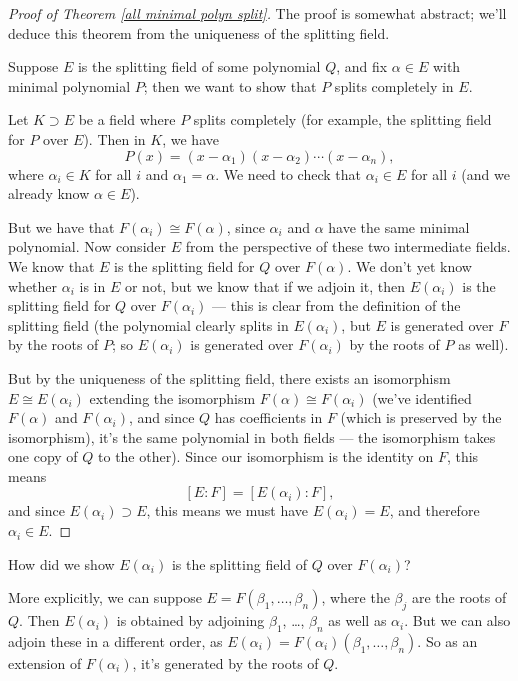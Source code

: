 \begin{proof}[Proof of Theorem \ref{all minimal polyn split}]
    The proof is somewhat abstract; we'll deduce this theorem from the uniqueness of the splitting field. 

    Suppose $E$ is the splitting field of some polynomial $Q$, and fix $\alpha \in E$ with minimal polynomial $P$; then we want to show that $P$ splits completely in $E$. 

    Let $K \supset E$ be a field where $P$ splits completely (for example, the splitting field for $P$ over $E$). Then in $K$, we have \[P(x) = (x - \alpha_1)(x - \alpha_2)\cdots (x - \alpha_n),\] where $\alpha_i \in K$ for all $i$ and $\alpha_1 = \alpha$. We need to check that $\alpha_i \in E$ for all $i$ (and we already know $\alpha \in E$). 

    But we have that $F(\alpha_i) \cong F(\alpha)$, since $\alpha_i$ and $\alpha$ have the same minimal polynomial. Now consider $E$ from the perspective of these two intermediate fields. We know that $E$ is the splitting field for $Q$ over $F(\alpha)$. We don't yet know whether $\alpha_i$ is in $E$ or not, but we know that if we adjoin it, then $E(\alpha_i)$ is the splitting field for $Q$ over $F(\alpha_i)$ --- this is clear from the definition of the splitting field (the polynomial clearly splits in $E(\alpha_i)$, but $E$ is generated over $F$ by the roots of $P$; so $E(\alpha_i)$ is generated over $F(\alpha_i)$ by the roots of $P$ as well).

    But by the uniqueness of the splitting field, there exists an isomorphism $E \cong E(\alpha_i)$ extending the isomorphism $F(\alpha) \cong F(\alpha_i)$ (we've identified $F(\alpha)$ and $F(\alpha_i)$, and since $Q$ has coefficients in $F$ (which is preserved by the isomorphism), it's the same polynomial in both fields --- the isomorphism takes one copy of $Q$ to the other). Since our isomorphism is the identity on $F$, this means \[[E : F] = [E(\alpha_i) : F],\] and since $E(\alpha_i) \supset E$, this means we must have $E(\alpha_i) = E$, and therefore $\alpha_i \in E$. 
\end{proof}

\begin{question}
How did we show $E(\alpha_i)$ is the splitting field of $Q$ over $F(\alpha_i)$?
\end{question}

\begin{ans}
More explicitly, we can suppose $E = F(\beta_1, \ldots, \beta_n)$, where the $\beta_j$ are the roots of $Q$. Then $E(\alpha_i)$ is obtained by adjoining $\beta_1$, \ldots, $\beta_n$ as well as $\alpha_i$. But we can also adjoin these in a different order, as $E(\alpha_i) = F(\alpha_i)(\beta_1, \ldots, \beta_n)$. So as an extension of $F(\alpha_i)$, it's generated by the roots of $Q$. 
\end{ans}


